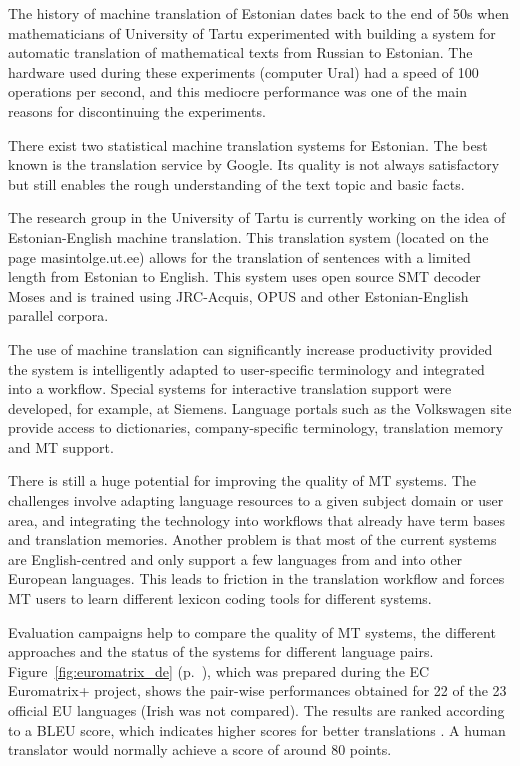 \begin{multicols}{2}
The history of machine translation of Estonian dates back to the end of 50s when mathematicians of University of Tartu experimented with building a system for automatic translation of mathematical texts from Russian to Estonian. 
The hardware used during these experiments (computer Ural) had a speed of 100 operations per second, and this mediocre performance was one of the main reasons for discontinuing the experiments.

There exist two statistical machine translation systems for Estonian. 
The best known is the translation service by Google. 
Its quality is not always satisfactory but still enables the rough understanding of the text topic and basic facts.

The research group in the University of Tartu is currently working on the idea of Estonian-English machine translation. 
This translation system (located on the page masintolge.ut.ee) allows for the translation of sentences with a limited length from Estonian to English. 
This system uses open source SMT decoder Moses and is trained using JRC-Acquis, OPUS and other Estonian-English parallel corpora.

The use of machine translation can significantly increase productivity provided the system is intelligently adapted to user-specific terminology and integrated into a workflow. 
Special systems for interactive translation support were developed, for example, at Siemens. 
Language portals such as the Volkswagen site provide access to dictionaries, company-specific terminology, translation memory and MT support. 

There is still a huge potential for improving the quality of MT systems. The challenges involve adapting language resources to a given subject domain or user area, and integrating the technology into workflows that already have term bases and translation memories. Another problem is that most of the current systems are English-centred and only support a few languages from and into other European languages. This leads to friction in the translation workflow and forces MT users to learn different lexicon coding tools for different systems.

Evaluation campaigns help to compare the quality of MT systems, the different approaches and the status of the systems for different language pairs. Figure~\ref{fig:euromatrix_de} (p.~\pageref{fig:euromatrix_de}), which was prepared during the EC Euromatrix+ project, shows the pair-wise performances obtained for 22 of the 23 official EU languages (Irish was not compared). The results are ranked according to a BLEU score, which indicates higher scores for better translations \cite{bleu1}. A human translator would normally achieve a score of around 80 points.


\end{multicols}
